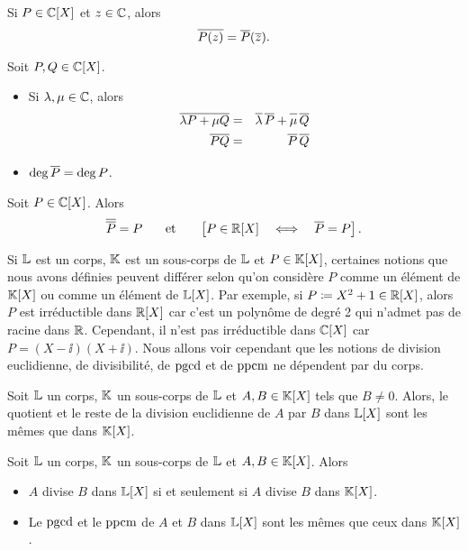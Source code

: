 \documentclass{magnolia}
\begin{document}
\begin{remarqueUnique}
\remarque Si $P\in\polyC$ et $z\in\mathbb{C}$, alors
  \[\overline{P(z)}=\overline{P}(\overline{z}).\]
\end{remarqueUnique}

\begin{proposition}
Soit $P,Q\in\polyC$.
\begin{itemize}
\item  Si $\lambda,\mu\in\mathbb{C}$, alors
\begin{eqnarray*}
  \conj{\lambda P+\mu Q}&=&\conj{\lambda}\, \conj{P}+\conj{\rule{0pt}{6.75pt}\mu}\, \conj{Q}\\
  \conj{P Q}&=&\conj{P}\,\conj{Q}
  \end{eqnarray*}
\item $\deg\overline{P}=\deg P$.
\end{itemize}
\end{proposition}

\begin{proposition}
Soit $P\in\polyC$. Alors
\[\conj{\conj{P}}=P \quad\et\quad \cro{P\in\polyR \quad\ssi\quad \conj{P}=P}.\]
\end{proposition}


 Si $\mathbb{L}$ est un corps, $\mathbb{K}$ est un sous-corps de $\mathbb{L}$ et $P\in\polyK$,
  certaines notions que nous avons définies peuvent différer selon qu'on considère
  $P$ comme un élément de $\polyK$ ou comme un élément de $\polyL$. Par exemple,
  si $P\defeq X^2+1\in\polyR$, alors $P$ est irréductible dans $\polyR$ car c'est
  un polynôme de degré 2 qui n'admet pas de racine dans $\mathbb{R}$. Cependant, il n'est pas
  irréductible dans $\polyC$ car $P=(X-\ii)(X+\ii)$.
  Nous allons voir cependant que les notions de division euclidienne, de divisibilité,
  de $\operatorname{pgcd}$ et de $\operatorname{ppcm}$ ne dépendent par du corps.



\begin{proposition}
Soit $\mathbb{L}$ un corps, $\mathbb{K}$ un sous-corps de $\mathbb{L}$ et $A,B\in\polyK$ tels que $B\neq 0$.
Alors, le quotient et le reste de la division euclidienne de $A$ par $B$
dans $\polyL$ sont les mêmes que dans $\polyK$.
\end{proposition}

\begin{proposition}
Soit $\mathbb{L}$ un corps, $\mathbb{K}$ un sous-corps de $\mathbb{L}$ et $A,B\in\polyK$. Alors
\begin{itemize}
\item $A$ divise $B$ dans $\polyL$ si et seulement si $A$ divise $B$ dans
  $\polyK$.
\item Le $\operatorname{pgcd}$ et le $\operatorname{ppcm}$ de $A$ et $B$ dans $\polyL$ sont les mêmes que ceux dans $\polyK$.
\end{itemize}
\end{proposition}
\end{document}
